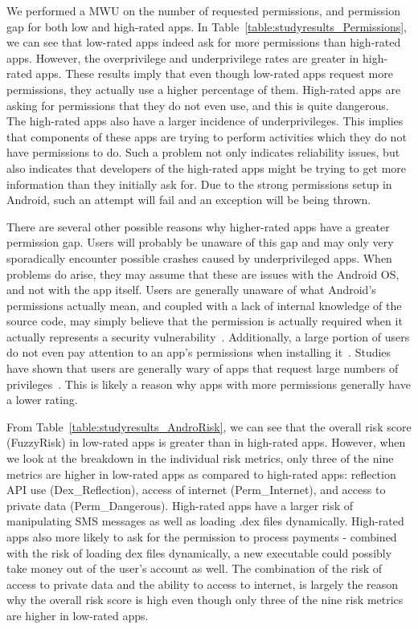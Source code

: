 \documentclass{sig-alternate}
\begin{document}
We performed a MWU on the number of requested permissions, and permission gap for both low and high-rated apps. In Table~\ref{table:studyresults_Permissions}, we can see that low-rated apps indeed ask for more permissions than high-rated apps. However, the overprivilege and underprivilege rates are greater in high-rated apps. These results imply that even though low-rated apps request more permissions, they actually use a higher percentage of them. High-rated apps are asking for permissions that they do not even use, and this is quite dangerous. The high-rated apps also have a larger incidence of underprivileges. This implies that components of these apps are trying to perform activities which they do not have permissions to do. Such a problem not only indicates reliability issues, but also indicates that developers of the high-rated apps might be trying to get more information than they initially ask for. Due to the strong permissions setup in Android, such an attempt will fail and an exception will be being thrown. %


There are several other possible reasons why higher-rated apps have a greater permission gap. Users will probably be unaware of this gap and may only very sporadically encounter possible crashes caused by underprivileged apps. When problems do arise, they may assume that these are issues with the Android OS, and not with the app itself. Users are generally unaware of what Android's permissions actually mean, and coupled with a lack of internal knowledge of the source code, may simply believe that the permission is actually required when it actually represents a security vulnerability~\cite{Li:2005:ETC:1095714.1095770}. Additionally, a large portion of users do not even pay attention to an app's permissions when installing it~\cite{Felt:2012:APU:2335356.2335360}. Studies have shown that users are generally wary of apps that request large numbers of privileges~\cite{wijesekera2015android}. This is likely a reason why apps with more permissions generally have a lower rating.


From Table~\ref{table:studyresults_AndroRisk}, we can see that the overall risk score (FuzzyRisk) in low-rated apps is greater than in high-rated apps. However, when we look at the breakdown in the individual risk metrics, only three of the nine metrics are higher in low-rated apps as compared to high-rated apps: reflection API use (Dex\_Reflection), access of internet (Perm\_Internet), and access to private data (Perm\_Dangerous). High-rated apps have a larger risk of manipulating SMS messages as well as loading .dex files dynamically. High-rated apps also more likely to ask for the permission to process payments - combined with the risk of loading dex files dynamically, a new executable could possibly take money out of the user's account as well. The combination of the risk of access to private data and the ability to access to internet, is largely the reason why the overall risk score is high even though only three of the nine risk metrics are higher in low-rated apps.
\end{document}

